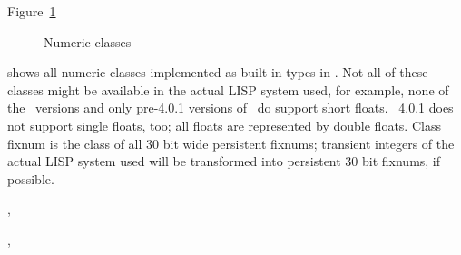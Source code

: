 Figure~\ref{fig:NumericClasses} %
\begin{figure}[htbp]
\centerline{}
\caption{Numeric classes}%
\label{fig:NumericClasses}
\end{figure}%
shows all numeric classes implemented as built in types in
\plobwoexcl. Not all of these classes might be available in the actual
LISP system used, for example, none of the \allegrocl\ versions and
only pre-4.0.1 versions of \lwcl\ do support short floats. \lwcl\ 
4.0.1 does not support single floats, too; all floats are represented
by double floats. Class fixnum is the class of all 30 bit wide
persistent fixnums; transient integers of the actual LISP system used
will be transformed into persistent 30 bit fixnums, if possible.

\begin{NarrowRefList}
\Allocator {}
\Creator {}
\TypePredicate {}
\ObjectStore {}
\ObjectLoad {}
\end{NarrowRefList}

\begin{NarrowRefList}
\Allocator {}
\Creator {}
\TypePredicate {}
\ObjectStore {}
\ObjectLoad {}
\end{NarrowRefList}

\begin{NarrowRefList}
\Allocator {}
\Creator {}
\TypePredicate {}
\ObjectStore {}
\ObjectLoad {}
\end{NarrowRefList}

\begin{NarrowRefList}
\Allocator {}
\TypePredicate {}
\ObjectStore {}
\ObjectLoad {}
\SlotReader {}, 
\end{NarrowRefList}

\begin{NarrowRefList}
\Allocator {}
\TypePredicate {}
\ObjectStore {}
\ObjectLoad {}
\SlotReader {}, 
\end{NarrowRefList}

